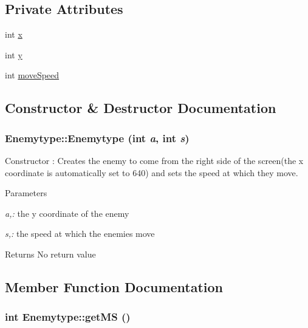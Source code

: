 \subsection*{Private Attributes}
\begin{DoxyCompactItemize}
\item 
int \hyperlink{classEnemytype_ac73360c104ab8e6f4cad79af69e904dd}{x}
\item 
int \hyperlink{classEnemytype_a22ab8ba090798eb7fad364b0319f4d13}{y}
\item 
int \hyperlink{classEnemytype_a7fbb15c1e006c25cc926b55cd3ea23dd}{moveSpeed}
\end{DoxyCompactItemize}


\subsection{Constructor \& Destructor Documentation}
\hypertarget{classEnemytype_a315e220bfb4ffe6c67f31ac57b015679}{
\subsubsection[{Enemytype}]{\setlength{\rightskip}{0pt plus 5cm}Enemytype::Enemytype (int {\em a}, \/  int {\em s})}}
\label{classEnemytype_a315e220bfb4ffe6c67f31ac57b015679}


Constructor : Creates the enemy to come from the right side of the screen(the x coordinate is automatically set to 640) and sets the speed at which they move. 
\begin{DoxyParams}{Parameters}
\item[{\em a,:}]the y coordinate of the enemy \item[{\em s,:}]the speed at which the enemies move \end{DoxyParams}
\begin{DoxyReturn}{Returns}
No return value 
\end{DoxyReturn}


\subsection{Member Function Documentation}
\hypertarget{classEnemytype_adc3cce767c80a8dee47acd0e48691ac3}{
\subsubsection[{getMS}]{\setlength{\rightskip}{0pt plus 5cm}int Enemytype::getMS ()}}
\label{classEnemytype_adc3cce767c80a8dee47acd0e48691ac3}



